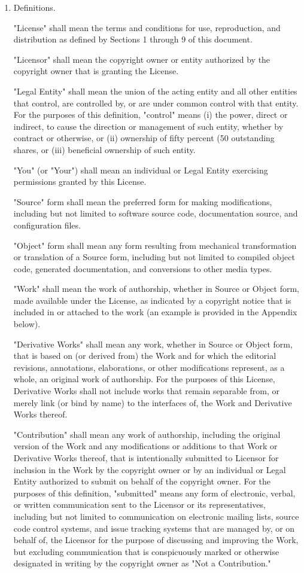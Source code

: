 \begin{enumerate}
\item Definitions.

"License" shall mean the terms and conditions for use, reproduction,
and distribution as defined by Sections 1 through 9 of this document.

"Licensor" shall mean the copyright owner or entity authorized by
the copyright owner that is granting the License.

"Legal Entity" shall mean the union of the acting entity and all
other entities that control, are controlled by, or are under common
control with that entity. For the purposes of this definition,
"control" means (i) the power, direct or indirect, to cause the
direction or management of such entity, whether by contract or
otherwise, or (ii) ownership of fifty percent (50%
outstanding shares, or (iii) beneficial ownership of such entity.

"You" (or "Your") shall mean an individual or Legal Entity
exercising permissions granted by this License.

"Source" form shall mean the preferred form for making modifications,
including but not limited to software source code, documentation
source, and configuration files.

"Object" form shall mean any form resulting from mechanical
transformation or translation of a Source form, including but
not limited to compiled object code, generated documentation,
and conversions to other media types.

"Work" shall mean the work of authorship, whether in Source or
Object form, made available under the License, as indicated by a
copyright notice that is included in or attached to the work
(an example is provided in the Appendix below).

"Derivative Works" shall mean any work, whether in Source or Object
form, that is based on (or derived from) the Work and for which the
editorial revisions, annotations, elaborations, or other modifications
represent, as a whole, an original work of authorship. For the purposes
of this License, Derivative Works shall not include works that remain
separable from, or merely link (or bind by name) to the interfaces of,
the Work and Derivative Works thereof.

"Contribution" shall mean any work of authorship, including
the original version of the Work and any modifications or additions
to that Work or Derivative Works thereof, that is intentionally
submitted to Licensor for inclusion in the Work by the copyright owner
or by an individual or Legal Entity authorized to submit on behalf of
the copyright owner. For the purposes of this definition, "submitted"
means any form of electronic, verbal, or written communication sent
to the Licensor or its representatives, including but not limited to
communication on electronic mailing lists, source code control systems,
and issue tracking systems that are managed by, or on behalf of, the
Licensor for the purpose of discussing and improving the Work, but
excluding communication that is conspicuously marked or otherwise
designated in writing by the copyright owner as "Not a Contribution."


\end{enumerate}
